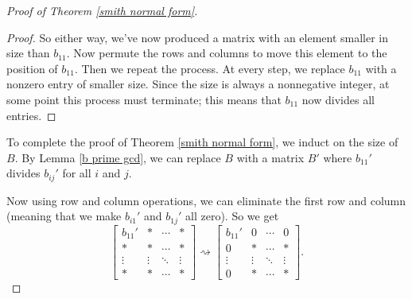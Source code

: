 \begin{proof}[Proof of Theorem \ref{smith normal form}]
\begin{proof}
So either way, we've now produced a matrix with an element smaller in size than $b_{11}$. Now permute the rows and columns to move this element to the position of $b_{11}$. Then we repeat the process. At every step, we replace $b_{11}$ with a nonzero entry of smaller size. Since the size is always a nonnegative integer, at some point this process must terminate; this means that $b_{11}$ now divides all entries. 
\end{proof}


To complete the proof of Theorem \ref{smith normal form}, we induct on the size of $B$. By Lemma \ref{b prime gcd}, we can replace $B$ with a matrix $B'$ where $b_{11}'$ divides $b_{ij}'$ for all $i$ and $j$. 

Now using row and column operations, we can eliminate the first row and column (meaning that we make $b_{i1}'$ and $b_{1j}'$ all zero). So we get \[
\begin{bmatrix}
b_{11}' & * & \cdots & * \\
* & * & \cdots & * \\
\vdots & \vdots & \ddots & \vdots \\
* & * & \cdots & * \end{bmatrix} 
 \rightsquigarrow \begin{bmatrix} b_{11}' & 0 & \cdots & 0 \\
0 & * & \cdots & * \\
\vdots & \vdots & \ddots & \vdots \\
0 & * & \cdots & * \end{bmatrix}.
\]


\end{proof}
